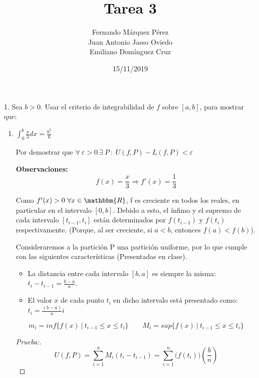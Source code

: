 \documentclass[12pt]{article}
\title{Tarea 3}
\author{Fernando Márquez Pérez \\ Juan Antonio Jasso Oviedo \\ Emiliano Dom\'inguez Cruz}
\date{15/11/2019}
\affil{Facultad de Ciencias\\UNAM}
\begin{document}
\begin{titlepage}
    \maketitle
\end{titlepage}

1. Sea $b>0$. Usar el criterio de integrabilidad de $f$ sobre $[a,b]$, para mostrar que:

\begin{enumerate}[\hspace{9px} a)]
    \item \(\displaystyle\int_{0}^{b}\frac{x}{3}dx=\frac{b^2}{6}\)\medskip

        Por demostrar que \(\forall \ \varepsilon>0 \ \exists \ P \ : \ U(f,P)-L(f,P)<\varepsilon\)\medskip

        \textbf{Observaciones:}
        \[f(x)=\frac{x}{3} \Rightarrow f'(x)=\frac{1}{3}\]

        Como \(f'(x)>0 \ \forall x \in \mathbbm{R}\), f es creciente en todos los reales, en particular en el intervalo $[0,b]$. Debido a esto, el \'infimo y el supremo de cada intervalo \([t_{i-1},t_i]\) est\'an determinados por \(f(t_{i-1})\) y \(f(t_i)\) respectivamente. (Porque, al ser creciente, si $a<b$, entonces \(f(a)<f(b)\)).\medskip

        Consideraremos a la partici\'on P una partici\'on uniforme, por lo que cumple con las siguientes caracter\'isticas (Presentadas en clase).
        \begin{itemize}
            \item La distancia entre cada intervalo $[b,a]$ es siempre la misma: \(t_i-t_{i-1}=\displaystyle\frac{b-a}{n}\).
            \item El valor $x$ de cada punto $t_i$ en dicho intervalo est\'a presentado como: \(t_i=\displaystyle\frac{(b-a)}{n}i\)
        \end{itemize}

        \[m_i=inf\{f(x) \ | \ t_{i-1} \leq x \leq t_i\} \qquad M_i=sup\{f(x) \ | \ t_{i-1} \leq x \leq t_i\}\]

        \begin{proof}[Prueba:]
            \begin{equation*}%
                U(f,P)=\sum_{i=1}^n M_i(t_i-t_{i-1}) = \sum_{i=1}^n \big(f(t_i)\big)\left(\displaystyle\frac{b}{n}\right)
            \end{equation*}


\end{proof}
\end{enumerate}
\end{document}
